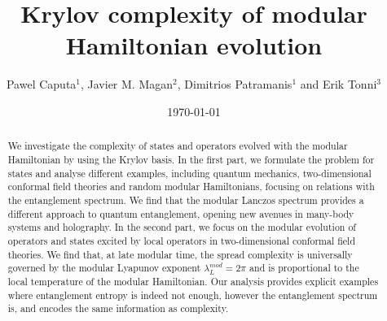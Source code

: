 \documentclass[aps,prl,twocolumn,showpacs,preprintnumbers,amsmath,amssymb]{revtex4-1}
\begin{document}
\title{Krylov complexity of modular Hamiltonian evolution}


\author{Pawel Caputa$^1$, Javier M. Magan$^2$, Dimitrios Patramanis$^1$ and Erik Tonni$^3$ }




\date{\today}


\begin{abstract}
We investigate the complexity of states and operators evolved with the modular Hamiltonian by using the Krylov basis. 
In the first part, we formulate the problem for states and analyse different examples, including quantum mechanics,  two-dimensional conformal field theories and random modular Hamiltonians, focusing on relations with the entanglement spectrum. We find that the modular Lanczos spectrum provides a different approach to quantum entanglement, opening new avenues in many-body systems and holography. In the second part, we focus on the modular evolution of operators and states excited by local operators in two-dimensional conformal field theories. We find that, at late modular time, the spread complexity is universally governed by the modular Lyapunov exponent $\lambda^{mod}_L=2\pi$ and is proportional to the local temperature of the modular Hamiltonian. Our analysis provides explicit examples where entanglement entropy is indeed not enough, however the entanglement spectrum is, and encodes the same information as complexity.

\end{abstract}

\maketitle

\end{document}

